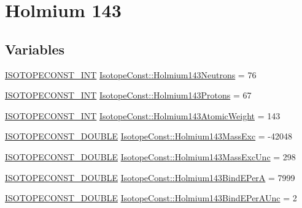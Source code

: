 \hypertarget{group___isotope_const-_holmium-_ho143}{}\section{Holmium 143}
\label{group___isotope_const-_holmium-_ho143}
\subsection*{Variables}
\begin{DoxyCompactItemize}
\item 
\mbox{\hyperlink{group___isotope_const-_macros_ga5f18360b3e99483a35c32d789e62621c}{I\+S\+O\+T\+O\+P\+E\+C\+O\+N\+S\+T\+\_\+\+I\+NT}} \mbox{\hyperlink{group___isotope_const-_holmium-_ho143_gac0d3f489fd72cb7de733675e22b09189}{Isotope\+Const\+::\+Holmium143\+Neutrons}} = 76
\item 
\mbox{\hyperlink{group___isotope_const-_macros_ga5f18360b3e99483a35c32d789e62621c}{I\+S\+O\+T\+O\+P\+E\+C\+O\+N\+S\+T\+\_\+\+I\+NT}} \mbox{\hyperlink{group___isotope_const-_holmium-_ho143_gaf318eff1d5fa6b2cca7ecc9c47b58888}{Isotope\+Const\+::\+Holmium143\+Protons}} = 67
\item 
\mbox{\hyperlink{group___isotope_const-_macros_ga5f18360b3e99483a35c32d789e62621c}{I\+S\+O\+T\+O\+P\+E\+C\+O\+N\+S\+T\+\_\+\+I\+NT}} \mbox{\hyperlink{group___isotope_const-_holmium-_ho143_gae93bf1c0b43995e5b96da735af739bde}{Isotope\+Const\+::\+Holmium143\+Atomic\+Weight}} = 143
\item 
\mbox{\hyperlink{group___isotope_const-_macros_ga8f45a7272ce02c0b4c65c44636ed719a}{I\+S\+O\+T\+O\+P\+E\+C\+O\+N\+S\+T\+\_\+\+D\+O\+U\+B\+LE}} \mbox{\hyperlink{group___isotope_const-_holmium-_ho143_gaa09c23279b50063084315368652ce50b}{Isotope\+Const\+::\+Holmium143\+Mass\+Exc}} = -\/42048
\item 
\mbox{\hyperlink{group___isotope_const-_macros_ga8f45a7272ce02c0b4c65c44636ed719a}{I\+S\+O\+T\+O\+P\+E\+C\+O\+N\+S\+T\+\_\+\+D\+O\+U\+B\+LE}} \mbox{\hyperlink{group___isotope_const-_holmium-_ho143_ga87d3eec40b83a7aa9405f7906457bd1e}{Isotope\+Const\+::\+Holmium143\+Mass\+Exc\+Unc}} = 298
\item 
\mbox{\hyperlink{group___isotope_const-_macros_ga8f45a7272ce02c0b4c65c44636ed719a}{I\+S\+O\+T\+O\+P\+E\+C\+O\+N\+S\+T\+\_\+\+D\+O\+U\+B\+LE}} \mbox{\hyperlink{group___isotope_const-_holmium-_ho143_gaae856b2cda49465a68f98331d79a875e}{Isotope\+Const\+::\+Holmium143\+Bind\+E\+PerA}} = 7999
\item 
\mbox{\hyperlink{group___isotope_const-_macros_ga8f45a7272ce02c0b4c65c44636ed719a}{I\+S\+O\+T\+O\+P\+E\+C\+O\+N\+S\+T\+\_\+\+D\+O\+U\+B\+LE}} \mbox{\hyperlink{group___isotope_const-_holmium-_ho143_ga555d09aa524c2c4e27bf3da460470ca3}{Isotope\+Const\+::\+Holmium143\+Bind\+E\+Per\+A\+Unc}} = 2

\end{DoxyCompactItemize}

